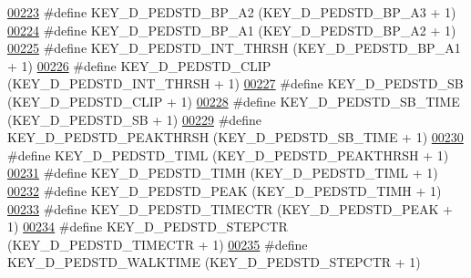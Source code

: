 \begin{DoxyCode}
\hypertarget{dmp_key_8h_source.tex_l00223}{}\hyperlink{dmp_key_8h_a93b4bfc0f7d08df58f26ee0b0fea8961}{00223} \textcolor{preprocessor}{#define KEY\_D\_PEDSTD\_BP\_A2          (KEY\_D\_PEDSTD\_BP\_A3 + 1)}
\hypertarget{dmp_key_8h_source.tex_l00224}{}\hyperlink{dmp_key_8h_a917ece48b64c9e901bfeb3faf78f5daa}{00224} \textcolor{preprocessor}{#define KEY\_D\_PEDSTD\_BP\_A1          (KEY\_D\_PEDSTD\_BP\_A2 + 1)}
\hypertarget{dmp_key_8h_source.tex_l00225}{}\hyperlink{dmp_key_8h_ad04090bd27a4e24a4bfd0c00d04e4d02}{00225} \textcolor{preprocessor}{#define KEY\_D\_PEDSTD\_INT\_THRSH      (KEY\_D\_PEDSTD\_BP\_A1 + 1)}
\hypertarget{dmp_key_8h_source.tex_l00226}{}\hyperlink{dmp_key_8h_a17f86dc80dfdfe11ddc66c336e3060d9}{00226} \textcolor{preprocessor}{#define KEY\_D\_PEDSTD\_CLIP           (KEY\_D\_PEDSTD\_INT\_THRSH + 1)}
\hypertarget{dmp_key_8h_source.tex_l00227}{}\hyperlink{dmp_key_8h_a6336f3662c2a9ad16c1ed60d88d5fd52}{00227} \textcolor{preprocessor}{#define KEY\_D\_PEDSTD\_SB             (KEY\_D\_PEDSTD\_CLIP + 1)}
\hypertarget{dmp_key_8h_source.tex_l00228}{}\hyperlink{dmp_key_8h_a08f94b42741662987878db54eea9cc33}{00228} \textcolor{preprocessor}{#define KEY\_D\_PEDSTD\_SB\_TIME        (KEY\_D\_PEDSTD\_SB + 1)}
\hypertarget{dmp_key_8h_source.tex_l00229}{}\hyperlink{dmp_key_8h_a88041bbbd66473c7ca9f8f9283699e46}{00229} \textcolor{preprocessor}{#define KEY\_D\_PEDSTD\_PEAKTHRSH      (KEY\_D\_PEDSTD\_SB\_TIME + 1)}
\hypertarget{dmp_key_8h_source.tex_l00230}{}\hyperlink{dmp_key_8h_a77ea7861309656c13cbde8473814487f}{00230} \textcolor{preprocessor}{#define KEY\_D\_PEDSTD\_TIML           (KEY\_D\_PEDSTD\_PEAKTHRSH + 1)}
\hypertarget{dmp_key_8h_source.tex_l00231}{}\hyperlink{dmp_key_8h_afe293d2e9cac339ff82c6794d00f0fb9}{00231} \textcolor{preprocessor}{#define KEY\_D\_PEDSTD\_TIMH           (KEY\_D\_PEDSTD\_TIML + 1)}
\hypertarget{dmp_key_8h_source.tex_l00232}{}\hyperlink{dmp_key_8h_a8d6c043c17a97c1d803f9d53f83d00a1}{00232} \textcolor{preprocessor}{#define KEY\_D\_PEDSTD\_PEAK           (KEY\_D\_PEDSTD\_TIMH + 1)}
\hypertarget{dmp_key_8h_source.tex_l00233}{}\hyperlink{dmp_key_8h_a77841577cf104713d837791e727dc6c5}{00233} \textcolor{preprocessor}{#define KEY\_D\_PEDSTD\_TIMECTR        (KEY\_D\_PEDSTD\_PEAK + 1)}
\hypertarget{dmp_key_8h_source.tex_l00234}{}\hyperlink{dmp_key_8h_a9cc22745fd13b5719bf609a53659ecaf}{00234} \textcolor{preprocessor}{#define KEY\_D\_PEDSTD\_STEPCTR        (KEY\_D\_PEDSTD\_TIMECTR + 1)}
\hypertarget{dmp_key_8h_source.tex_l00235}{}\hyperlink{dmp_key_8h_a7955e0338ae5b73b276a47ce651db549}{00235} \textcolor{preprocessor}{#define KEY\_D\_PEDSTD\_WALKTIME       (KEY\_D\_PEDSTD\_STEPCTR + 1)}

\end{DoxyCode}
